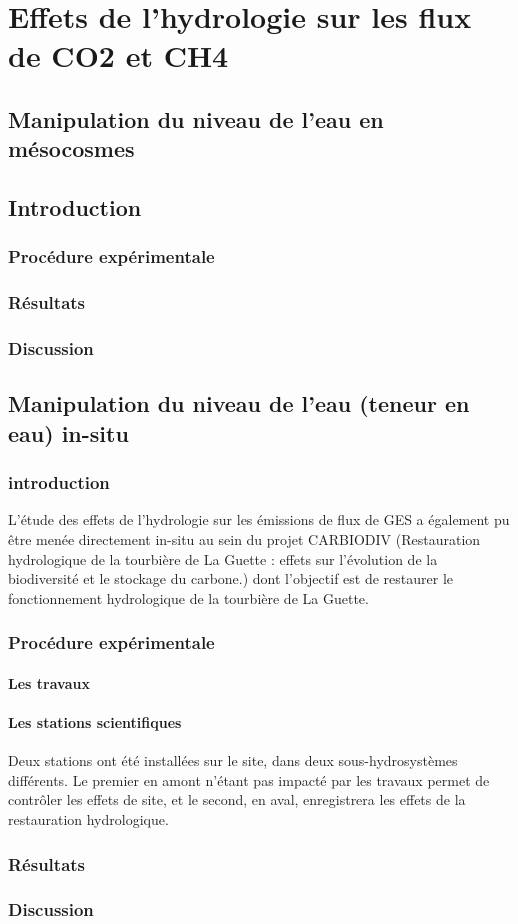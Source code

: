 \chapter{Effets de l'hydrologie sur les flux de CO2 et CH4}
\newpage

\section{Manipulation du niveau de l'eau en mésocosmes}
\section{Introduction}
\subsection{Procédure expérimentale}
\subsection{Résultats}
\subsection{Discussion}

\section{Manipulation du niveau de l'eau (teneur en eau) in-situ}
\subsection{introduction}
L'étude des effets de l'hydrologie sur les émissions de flux de GES a également pu être menée directement in-situ au sein du projet CARBIODIV (Restauration hydrologique de la tourbière de La Guette : effets sur l'évolution de la biodiversité et le stockage du carbone.) dont l'objectif est de restaurer le fonctionnement hydrologique de la tourbière de La Guette.
\subsection{Procédure expérimentale}
\subsubsection{Les travaux}
\subsubsection{Les stations scientifiques}
Deux stations ont été installées sur le site, dans deux sous-hydrosystèmes différents. Le premier en amont n'étant pas impacté par les travaux permet de contrôler les effets de site, et le second, en aval, enregistrera les effets de la restauration hydrologique.
\subsection{Résultats}
\subsection{Discussion}

